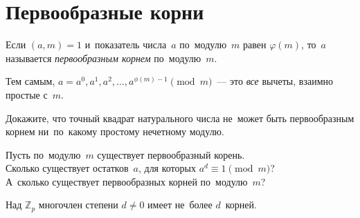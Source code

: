 
\section*{Первообразные корни}


Если $(a, m) = 1$ и~показатель числа~$a$ по~модулю~$m$ равен $\varphi(m)$,
то~$a$ называется \emph{первообразным корнем} по~модулю~$m$.

Тем самым, $a = a^0, a^1, a^2, \ldots, a^{\phi(m) - 1} \pmod{m}$~---
это \emph{все} вычеты, взаимно простые с~$m$.

Докажите, что точный квадрат натурального числа не~может быть первообразным
корнем ни~по~какому простому нечетному модулю.

\begin{problems}

\item
Пусть по~модулю~$m$ существует первообразный корень.
\\
\sp
Сколько существует остатков~$a$, для которых $a^d \equiv 1 \pmod m$?
\\
\sp
А~сколько существует первообразных корней по~модулю~$m$?

\end{problems}

Над $\mathbb{Z}_p$ многочлен степени $d \neq 0$ имеет не~более $d$~корней.

